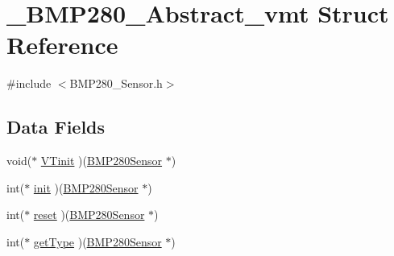 \hypertarget{struct___b_m_p280___abstract__vmt}{\section{\-\_\-\-B\-M\-P280\-\_\-\-Abstract\-\_\-vmt Struct Reference}
\label{struct___b_m_p280___abstract__vmt}
}


{\ttfamily \#include $<$B\-M\-P280\-\_\-\-Sensor.\-h$>$}

\subsection*{Data Fields}
\begin{DoxyCompactItemize}
\item 
void($\ast$ \hyperlink{struct___b_m_p280___abstract__vmt_a6105891d25d684f266988326151bbd67}{V\-Tinit} )(\hyperlink{_b_m_p280___sensor_8h_a60806e7544fdc94d70d1ef5937e17f28}{B\-M\-P280\-Sensor} $\ast$)
\item 
int($\ast$ \hyperlink{struct___b_m_p280___abstract__vmt_a36670528c4da556edc411db9edd3f36e}{init} )(\hyperlink{_b_m_p280___sensor_8h_a60806e7544fdc94d70d1ef5937e17f28}{B\-M\-P280\-Sensor} $\ast$)
\item 
int($\ast$ \hyperlink{struct___b_m_p280___abstract__vmt_a7c3c8f2aaf553fc88b3b14d21d0414e0}{reset} )(\hyperlink{_b_m_p280___sensor_8h_a60806e7544fdc94d70d1ef5937e17f28}{B\-M\-P280\-Sensor} $\ast$)
\item 
int($\ast$ \hyperlink{struct___b_m_p280___abstract__vmt_a64e3f581ea5deda4b375cf539b18f7d5}{get\-Type} )(\hyperlink{_b_m_p280___sensor_8h_a60806e7544fdc94d70d1ef5937e17f28}{B\-M\-P280\-Sensor} $\ast$)
\end{DoxyCompactItemize}


